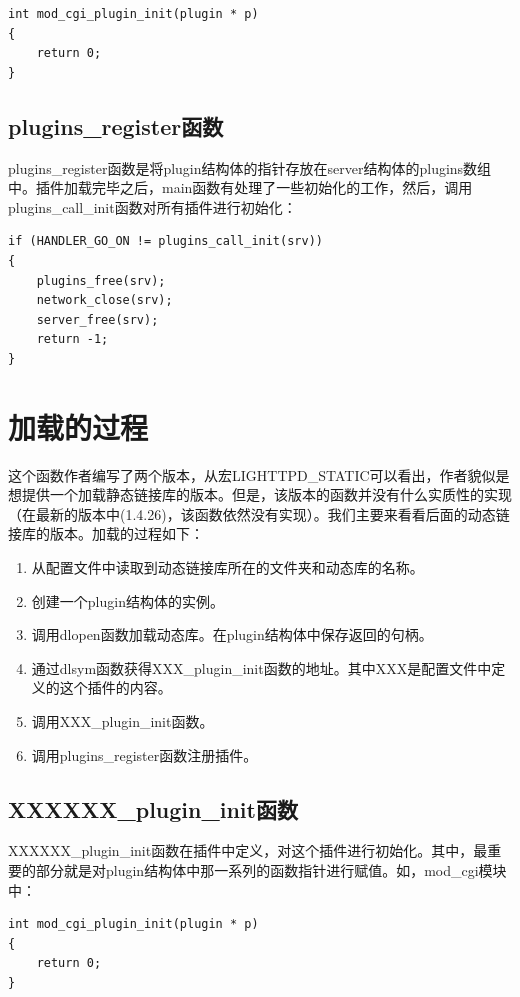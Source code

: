 \documentclass[12pt, dvipdfm]{book}
\begin{document}
\begin{verbatim}
int mod_cgi_plugin_init(plugin * p)
{
	return 0;
}
\end{verbatim}


\subsection{plugins\_register函数}
plugins\_register函数是将plugin结构体的指针存放在server结构体的plugins数组中。插件加载完毕之后，main函数有处理了一些初始化的工作，然后，调用plugins\_call\_init函数对所有插件进行初始化：

\begin{verbatim}
if (HANDLER_GO_ON != plugins_call_init(srv)) 
{
	plugins_free(srv);
	network_close(srv);
	server_free(srv);
	return -1;
}
\end{verbatim}

\section{加载的过程}
这个函数作者编写了两个版本，从宏LIGHTTPD\_STATIC可以看出，作者貌似是想提供一个加载静态链接库的版本。但是，该版本的函数并没有什么实质性的实现（在最新的版本中(1.4.26)，该函数依然没有实现）。我们主要来看看后面的动态链接库的版本。加载的过程如下：
\begin{enumerate}
	\item 从配置文件中读取到动态链接库所在的文件夹和动态库的名称。
	\item 创建一个plugin结构体的实例。
	\item 调用dlopen函数加载动态库。在plugin结构体中保存返回的句柄。
	\item 通过dlsym函数获得XXX\_plugin\_init函数的地址。其中XXX是配置文件中定义的这个插件的内容。
	\item 调用XXX\_plugin\_init函数。
	\item 调用plugins\_register函数注册插件。
\end{enumerate}

\subsection{XXXXXX\_plugin\_init函数}
XXXXXX\_plugin\_init函数在插件中定义，对这个插件进行初始化。其中，最重要的部分就是对plugin结构体中那一系列的函数指针进行赋值。如，mod\_cgi模块中：

\begin{verbatim}
int mod_cgi_plugin_init(plugin * p)
{
	return 0;
}
\end{verbatim}
\end{document}
